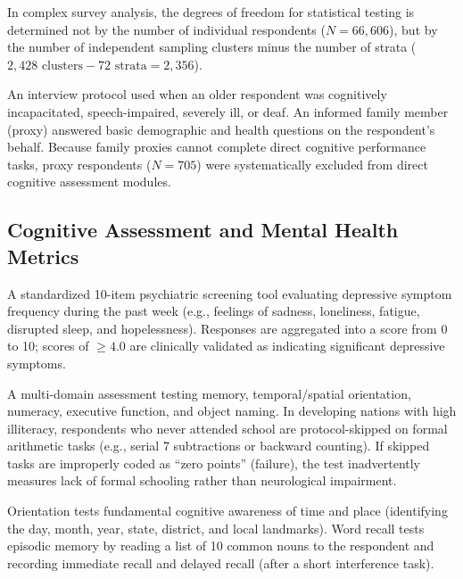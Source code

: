 \documentclass[11pt,a4paper]{article}
\begin{document}
\begin{description}[leftmargin=0.5cm, style=nextline]
    \item[\textbf{Survey Degrees of Freedom ($df = 2,356$):}]
    In complex survey analysis, the degrees of freedom for statistical testing is determined not by the number of individual respondents ($N=66,606$), but by the number of independent sampling clusters minus the number of strata ($2,428 \text{ clusters} - 72 \text{ strata} = 2,356$).

    \item[\textbf{Proxy Interview (\texttt{rproxy}):}]
    An interview protocol used when an older respondent was cognitively incapacitated, speech-impaired, severely ill, or deaf. An informed family member (proxy) answered basic demographic and health questions on the respondent's behalf. Because family proxies cannot complete direct cognitive performance tasks, proxy respondents ($N=705$) were systematically excluded from direct cognitive assessment modules.
\end{description}

\subsection{Cognitive Assessment and Mental Health Metrics}
\begin{description}[leftmargin=0.5cm, style=nextline]
    \item[\textbf{CES-D-10 Scale (Center for Epidemiologic Studies Depression):}]
    A standardized 10-item psychiatric screening tool evaluating depressive symptom frequency during the past week (e.g., feelings of sadness, loneliness, fatigue, disrupted sleep, and hopelessness). Responses are aggregated into a score from 0 to 10; scores of $\ge 4.0$ are clinically validated as indicating significant depressive symptoms.

    \item[\textbf{Cognitive Battery and Item-Skip Bias:}]
    A multi-domain assessment testing memory, temporal/spatial orientation, numeracy, executive function, and object naming. In developing nations with high illiteracy, respondents who never attended school are protocol-skipped on formal arithmetic tasks (e.g., serial 7 subtractions or backward counting). If skipped tasks are improperly coded as ``zero points'' (failure), the test inadvertently measures lack of formal schooling rather than neurological impairment.

    \item[\textbf{Orientation vs. Word Recall Domains:}]
    Orientation tests fundamental cognitive awareness of time and place (identifying the day, month, year, state, district, and local landmarks). Word recall tests episodic memory by reading a list of 10 common nouns to the respondent and recording immediate recall and delayed recall (after a short interference task).
\end{description}
\end{document}
